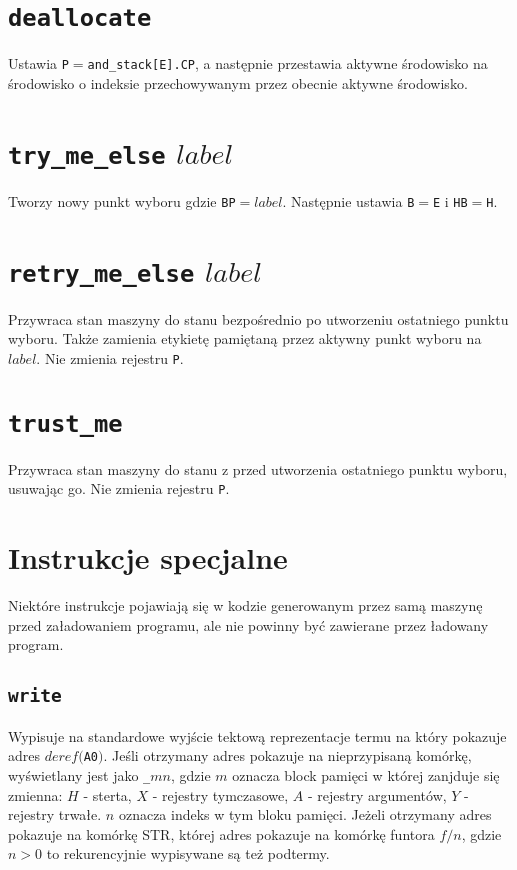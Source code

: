 \section{\texttt{deallocate}}

Ustawia \texttt{P}$ = $\texttt{and\_stack[E].CP}, a następnie przestawia aktywne środowisko na środowisko o indeksie przechowywanym przez obecnie aktywne środowisko.

\section{\texttt{try\_me\_else} $label$}

Tworzy nowy punkt wyboru gdzie \texttt{BP}$ = label$. Następnie ustawia \texttt{B}$ = $\texttt{E} i \texttt{HB}$ = $\texttt{H}.

\section{\texttt{retry\_me\_else} $label$}

Przywraca stan maszyny do stanu bezpośrednio po utworzeniu ostatniego punktu wyboru. Także zamienia etykietę pamiętaną przez aktywny punkt wyboru na $label$. Nie zmienia rejestru \texttt{P}.

\section{\texttt{trust\_me}}

Przywraca stan maszyny do stanu z przed utworzenia ostatniego punktu wyboru, usuwając go. Nie zmienia rejestru \texttt{P}.

\section{Instrukcje specjalne}

Niektóre instrukcje pojawiają się w kodzie generowanym przez samą maszynę przed załadowaniem programu, ale nie powinny być zawierane przez ładowany program.

\subsection{\texttt{write}}

Wypisuje na standardowe wyjście tektową reprezentacje termu na który pokazuje adres $deref($\texttt{A0}$)$. Jeśli otrzymany adres pokazuje na nieprzypisaną komórkę, wyświetlany jest jako \texttt{\_}$mn$, gdzie $m$ oznacza block pamięci w której zanjduje się zmienna: $H$ - sterta, $X$ - rejestry tymczasowe, $A$ - rejestry argumentów, $Y$ - rejestry trwałe. $n$ oznacza indeks w tym bloku pamięci. Jeżeli otrzymany adres pokazuje na komórkę STR, której adres pokazuje na komórkę funtora $f/n$, gdzie $n > 0$ to rekurencyjnie wypisywane są też podtermy.
\fi


